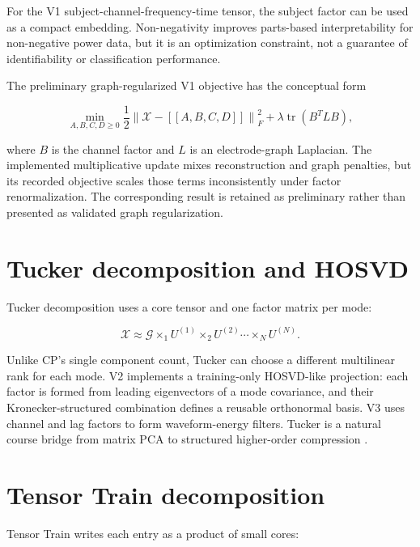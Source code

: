For the V1 subject-channel-frequency-time tensor, the subject factor can be
used as a compact embedding. Non-negativity improves parts-based interpretability
for non-negative power data, but it is an optimization constraint, not a
guarantee of identifiability or classification performance.

The preliminary graph-regularized V1 objective has the conceptual form

\begin{equation}
\min_{A,B,C,D\geq0}
\frac{1}{2}\left\|\mathcal{X}-[[A,B,C,D]]\right\|_F^2
+\lambda\operatorname{tr}(B^T L B),
\label{eq:graphcp}
\end{equation}

where $B$ is the channel factor and $L$ is an electrode-graph Laplacian. The
implemented multiplicative update mixes reconstruction and graph penalties,
but its recorded objective scales those terms inconsistently under factor
renormalization. The corresponding result is retained as preliminary rather
than presented as validated graph regularization.

\section{Tucker decomposition and HOSVD}

Tucker decomposition uses a core tensor and one factor matrix per mode:

\begin{equation}
\mathcal{X}\approx\mathcal{G}\times_1 U^{(1)}\times_2 U^{(2)}
\cdots\times_N U^{(N)}.
\label{eq:tucker}
\end{equation}

Unlike CP's single component count, Tucker can choose a different multilinear
rank for each mode. V2 implements a training-only HOSVD-like projection: each
factor is formed from leading eigenvectors of a mode covariance, and their
Kronecker-structured combination defines a reusable orthonormal basis. V3 uses
channel and lag factors to form waveform-energy filters. Tucker is a natural
course bridge from matrix PCA to structured higher-order compression
\citep{kolda2009tensor,padhy2026lowrank}.

\section{Tensor Train decomposition}

Tensor Train writes each entry as a product of small cores:

